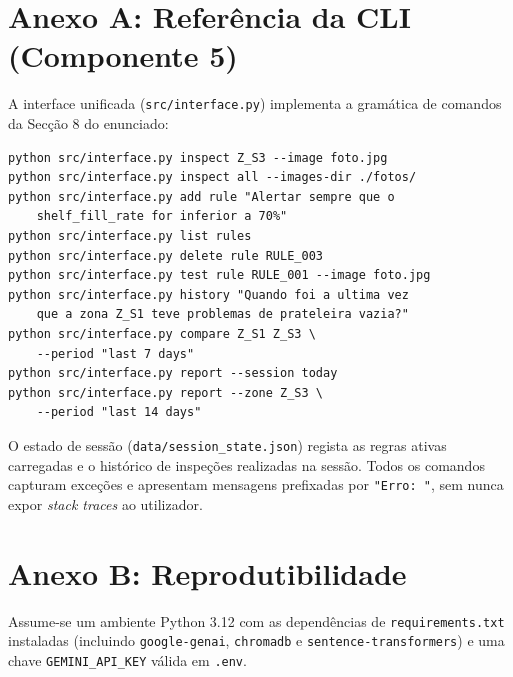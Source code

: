 \documentclass[conference]{IEEEtran}
\begin{document}
\appendix
\section{Anexo A: Referência da CLI (Componente 5)}

A interface unificada (\texttt{src/interface.py}) implementa a gramática de
comandos da Secção 8 do enunciado:

\begin{lstlisting}
python src/interface.py inspect Z_S3 --image foto.jpg
python src/interface.py inspect all --images-dir ./fotos/
python src/interface.py add rule "Alertar sempre que o
    shelf_fill_rate for inferior a 70%"
python src/interface.py list rules
python src/interface.py delete rule RULE_003
python src/interface.py test rule RULE_001 --image foto.jpg
python src/interface.py history "Quando foi a ultima vez
    que a zona Z_S1 teve problemas de prateleira vazia?"
python src/interface.py compare Z_S1 Z_S3 \
    --period "last 7 days"
python src/interface.py report --session today
python src/interface.py report --zone Z_S3 \
    --period "last 14 days"
\end{lstlisting}

O estado de sessão (\texttt{data/session\_state.json}) regista as regras
ativas carregadas e o histórico de inspeções realizadas na sessão. Todos os
comandos capturam exceções e apresentam mensagens prefixadas por
\texttt{"Erro: "}, sem nunca expor \textit{stack traces} ao utilizador.

\section{Anexo B: Reprodutibilidade}

Assume-se um ambiente Python 3.12 com as dependências de
\texttt{requirements.txt} instaladas (incluindo \texttt{google-genai},
\texttt{chromadb} e \texttt{sentence-transformers}) e uma chave
\texttt{GEMINI\_API\_KEY} válida em \texttt{.env}.
\end{document}
